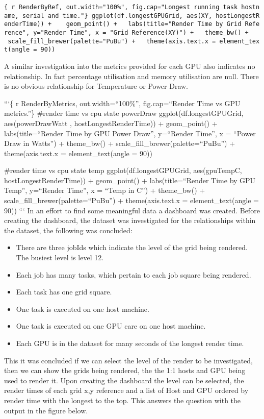 \documentclass[
  twocolumn]{article}
\providecommand{\tightlist}{%
  \setlength{\itemsep}{0pt}\setlength{\parskip}{0pt}}
\begin{document}
\texttt{\{\ r\ RenderByRef,\ out.width="100\%",\ fig.cap="Longest\ running\ task\ hostname,\ serial\ and\ time."\}\ ggplot(df.longestGPUGrid,\ aes(XY,\ hostLongestRenderTime))\ +\ \ \ \ geom\_point()\ +\ \ \ labs(title="Render\ Time\ by\ Grid\ Reference",\ y="Render\ Time",\ x\ =\ "Grid\ Reference(XY)")\ +\ \ \ theme\_bw()\ +\ \ \ \ scale\_fill\_brewer(palette="PuBu")\ +\ \ \ theme(axis.text.x\ =\ element\_text(angle\ =\ 90))}

A similar investigation into the metrics provided for each GPU also
indicates no relationship. In fact percentage utilisation and memory
utilisation are null. There is no obvious relationship for Temperature
or Power Draw.

```\{ r RenderByMetrics, out.width=``100\%'', fig.cap=``Render Time vs
GPU metrics.''\} \#render time vs cpu state powerDraw
ggplot(df.longestGPUGrid, aes(powerDrawWatt , hostLongestRenderTime)) +
geom\_point() + labs(title=``Render Time by GPU Power Draw'', y=``Render
Time'', x = ``Power Draw in Watts'') + theme\_bw() +
scale\_fill\_brewer(palette=``PuBu'') + theme(axis.text.x =
element\_text(angle = 90))

\#render time vs cpu state temp ggplot(df.longestGPUGrid, aes(gpuTempC,
hostLongestRenderTime)) + geom\_point() + labs(title=``Render Time by
GPU Temp'', y=``Render Time'', x = ``Temp in C'') + theme\_bw() +
scale\_fill\_brewer(palette=``PuBu'') + theme(axis.text.x =
element\_text(angle = 90)) ``` In an effort to find some meaningful data
a dashboard was created. Before creating the dashboard, the dataset was
investigated for the relationships within the dataset, the following was
concluded:

\begin{itemize}
\tightlist
\item
  There are three jobIds which indicate the level of the grid being
  rendered. The busiest level is level 12.
\item
  Each job has many tasks, which pertain to each job square being
  rendered.
\item
  Each task has one grid square.
\item
  One task is executed on one host machine.
\item
  One task is executed on one GPU care on one host machine.
\item
  Each GPU is in the dataset for many seconds of the longest render
  time.
\end{itemize}

This it was concluded if we can select the level of the render to be
investigated, then we can show the grids being rendered, the the 1:1
hosts and GPU being used to render it. Upon creating the dashboard the
level can be selected, the render times of each grid x,y reference and a
list of Host and GPU ordered by render time with the longest to the top.
This answers the question with the output in the figure below.
\end{document}
